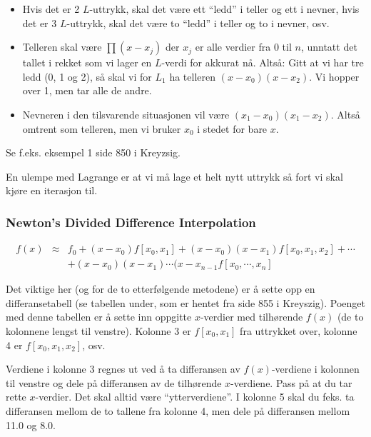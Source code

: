 \documentclass[norsk, a4paper, 12pt, titlepage]{article}
\begin{document}
\begin{itemize}
\item Hvis det er 2 $L$-uttrykk, skal det være ett ``ledd'' i teller
og ett i nevner, hvis det er 3 $L$-uttrykk, skal det være to ``ledd''
i teller og to i nevner, osv.
\item Telleren skal være $\prod (x - x_{j})$ der $x_{j}$ er alle
verdier fra 0 til $n$, unntatt det tallet i rekket som vi lager en
$L$-verdi for akkurat nå.  Altså: Gitt at vi har tre ledd (0, 1 og 2),
så skal vi for $L_{1}$ ha telleren $(x - x_{0})(x - x_{2})$.  Vi
hopper over 1, men tar alle de andre.
\item Nevneren i den tilsvarende situasjonen vil være $(x_{1} -
x_{0})(x_{1} - x_{2})$.  Altså omtrent som telleren, men vi bruker
$x_{0}$ i stedet for bare $x$.
\end{itemize}

Se f.eks. eksempel 1 side 850 i Kreyzsig.

En ulempe med Lagrange er at vi må lage et helt nytt uttrykk så fort
vi skal kjøre en iterasjon til.


\subsubsection{Newton's Divided Difference Interpolation}

\begin{eqnarray*}
f(x) & \approx & f_{0} + (x - x_{0})f[x_{0}, x_{1}] + (x - x_{0})(x -
x_{1})f[x_{0}, x_{1}, x_{2}] + \cdots \\
& & + (x - x_{0})(x - x_{1})\cdots (x - x_{n-1}f[x_{0}, \cdots, x_{n}]
\end{eqnarray*}

Det viktige her (og for de to etterfølgende metodene) er å sette opp
en differansetabell (se tabellen under, som er hentet fra side 855 i
Kreyszig).  Poenget med denne tabellen er å sette inn oppgitte
$x$-verdier med tilhørende $f(x)$ (de to kolonnene lengst til
venstre).  Kolonne 3 er $f[x_{0}, x_{1}]$ fra uttrykket over, kolonne
4 er $f[x_{0}, x_{1}, x_{2}]$, osv.

Verdiene i kolonne 3 regnes ut ved å ta differansen av $f(x)$-verdiene
i kolonnen til venstre og dele på differansen av de tilhørende
$x$-verdiene.  Pass på at du tar rette $x$-verdier.  Det skal alltid
være ``ytterverdiene''.  I kolonne 5 skal du feks. ta differansen
mellom de to tallene fra kolonne 4, men dele på differansen mellom
11.0 og 8.0.
\end{document}
